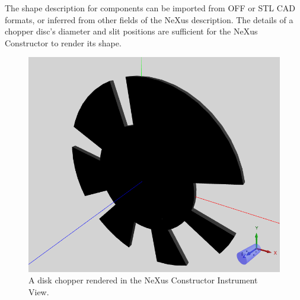 The shape description for components can be imported from OFF or STL CAD formats, or inferred from other fields of the NeXus description.
The details of a chopper disc's diameter and slit positions are sufficient for the NeXus Constructor to render its shape.

\begin{figure}
	\includegraphics[width=0.6\linewidth]{chopperinstrumentview.png}
	\caption{A disk chopper rendered in the NeXus Constructor Instrument View.}
\end{figure}
